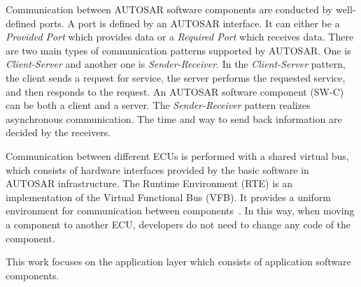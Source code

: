 Communication between AUTOSAR software components are conducted by well-defined ports. A port is  defined by an AUTOSAR interface. It can either be a {\em Provided Port} which provides data or a {\em Required Port} which receives data. There are two main types of communication patterns supported by AUTOSAR. One is {\em Client-Server} and another one is {\em Sender-Receiver}. In the {\em Client-Server} pattern, the client sends a request for service, the server performs the requested service, %
and then responds to the request. An AUTOSAR software component (SW-C) can be both a client and a server. The {\em Sender-Receiver} pattern realizes asynchronous communication. %
The time and way to send back information are decided by the receivers.

Communication between different ECUs is performed with a shared virtual bus, which consists of hardware interfaces provided by the basic software in AUTOSAR infrastructure. The Runtime Environment (RTE) is an implementation of the Virtual Functional Bus (VFB). It provides a uniform environment for communication between components~\cite{aa}. In this way, when moving a component to another ECU, developers do not need to change any code of the component. %



This work focuses on the application layer which consists of application software components. %


